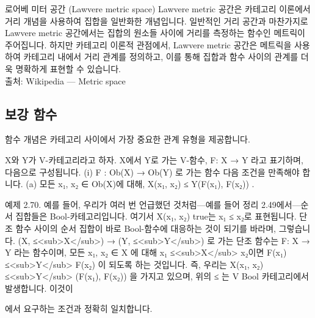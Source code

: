 \documentclass[11pt, a4paper, twoside, openany]{book}
\begin{document}
{\begin{deepresearch}{로어베 미터 공간 (Lawvere metric space)}
Lawvere metric 공간은 카테고리 이론에서 거리 개념을 사용하여 집합을 일반화한 개념입니다.  일반적인 거리 공간과 마찬가지로 Lawvere metric 공간에서는 집합의 원소들 사이에 거리를 측정하는 함수인 메트릭이 주어집니다. 하지만 카테고리 이론적 관점에서, Lawvere metric 공간은 메트릭을 사용하여 카테고리 내에서 거리 관계를 정의하고, 이를 통해 집합과 함수 사이의 관계를 더욱 명확하게 표현할 수 있습니다.
\\[4pt]{\footnotesize\color{ctgray} 출처: Wikipedia — Metric space}
\end{deepresearch}


\subsection{보강 함수}
\label{sec:2-4-2}

함수 개념은 카테고리 사이에서 가장 중요한 관계 유형을 제공합니다.

\par\medskip
\begin{definitionbox}[정의 2.69.]
X\hspace{0pt}와 Y\hspace{0pt}가 V-카테고리라고 하자. X\hspace{0pt}에서 Y\hspace{0pt}로 가는 V-함수, F: X → Y 라고 표기하며, 다음으로 구성됩니다.
(i)  F : Ob(X) → Ob(Y) 로 가는 함수
다음 조건을 만족해야 합니다.
(a) 모든 x₁, x₂ ∈ Ob(X)에 대해, X(x₁, x₂) ≤ Y(F(x₁), F(x₂)) .
\end{definitionbox}

\par\medskip
예제 2.70. 예를 들어, 우리가 여러 번 언급했던 것처럼—예를 들어 정리 2.49\hspace{0pt}에서—순서 집합들은 Bool-카테고리입니다. 여기서 X(x₁, x₂)  true\hspace{0pt}는 x₁ ≤ x₂로 표현됩니다. 단조 함수 사이의 순서 집합이 바로 Bool-함수에 대응하는 것이 되기를 바라며, 그렇습니다. (X, ≤<sub>X</sub>) → (Y, ≤<sub>Y</sub>) 로 가는 단조 함수는 F: X → Y 라는 함수이며, 모든 x₁, x₂ ∈ X 에 대해 x₁ ≤<sub>X</sub> x₂이면 F(x₁) ≤<sub>Y</sub> F(x₂) 이 되도록 하는 것입니다. 즉, 우리는 X(x₁, x₂) ≤<sub>Y</sub> (F(x₁), F(x₂)) 을 가지고 있으며, 위의 ≤ 는 V  Bool 카테고리에서 발생합니다. 이것이 
\begin{definitionbox}[정의 2.69]
에서 요구하는 조건과 정확히 일치합니다.
\end{definitionbox}

}
\end{document}
